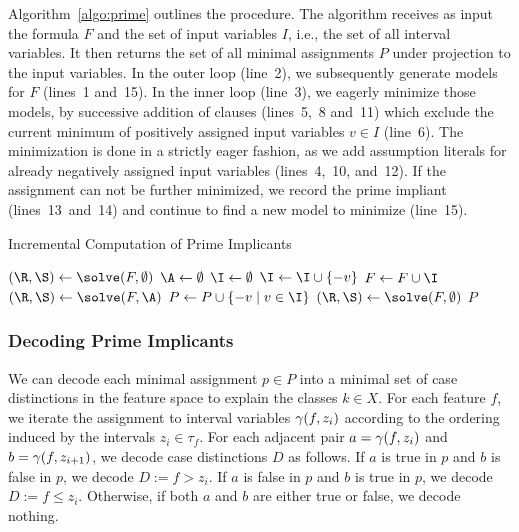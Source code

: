 \documentclass[a4paper, USenglish, cleveref, autoref, thm-restate]{lipics-v2021}
\theoremstyle{definition}
\begin{document}
Algorithm~\ref{algo:prime} outlines the procedure. 
The algorithm receives as input the formula $F$ and the set of input variables $I$, i.e., the set of all interval variables. 
It then returns the set of all minimal assignments $P$ under projection to the input variables. 
In the outer loop (line~2), we subsequently generate models for $F$ (lines~1 and~15). 
In the inner loop (line~3), we eagerly minimize those models, by successive addition of clauses (lines~5,~8 and~11) which exclude the current minimum of positively assigned input variables $v \in I$ (line~6). 
The minimization is done in a strictly eager fashion, as we add assumption literals for already negatively assigned input variables (lines~4,~10, and~12). 
If the assignment can not be further minimized, we record the prime impliant (lines~13~and~14) and continue to find a new model to minimize (line~15). 

\begin{algorithm}
\caption{Incremental Computation of Prime Implicants}
\label{algo:prime}
\DontPrintSemicolon



\BlankLine

$(\R,\S) \leftarrow \solve(F, \emptyset)$ \;
\While {\R} {
	\While {\R} {
		$\A \leftarrow \emptyset$ \;
		$\I \leftarrow \emptyset$ \;
		 {
			 {
				$\I \leftarrow \I \cup \{ -v \}$ \;
			}
		}
		$F \leftarrow F \cup \I$ \;
		$(\R,\S) \leftarrow \solve(F, \A)$ \;
		 {
			$P \leftarrow P \cup \{ -v \mid v \in \I \}$ \;
		}
	}
	$(\R,\S) \leftarrow \solve(F, \emptyset)$ \;
}
\Return $P$ \;
\end{algorithm}


\subsubsection{Decoding Prime Implicants}
\label{sec:approach:dec}

We can decode each minimal assignment $p \in P$ into a minimal set of case distinctions in the feature space to explain the classes $k \in X$. 
For each feature $f$, we iterate the assignment to interval variables $\gamma(f,z_i)$ according to the ordering induced by the intervals $z_i \in \tau_f$. 
For each adjacent pair $a=\gamma(f,z_i)$ and $b=\gamma(f,z_{i+1})$, we decode case distinctions $D$ as follows. 
If $a$ is true in $p$ and $b$ is false in $p$, we decode $D := f > z_i$. 
If $a$ is false in $p$ and $b$ is true in $p$, we decode $D := f \leq z_i$. 
Otherwise, if both $a$ and $b$ are either true or false, we decode nothing. 
\end{document}
